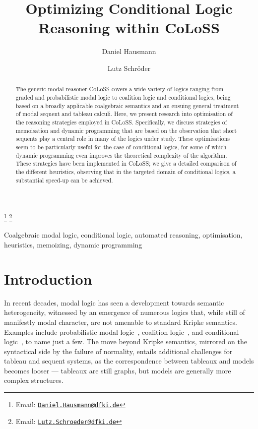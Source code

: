 \documentclass{entcs} \usepackage{entcsmacro}
\newcommand{\COLOSS}{{\textrm CoLoSS}}
\begin{document}
\begin{frontmatter}
  \title{Optimizing Conditional Logic Reasoning within \COLOSS}
  \author[DFKI]{Daniel Hausmann}
  \author[DFKI,UBremen]{Lutz Schr\"oder}
  \address[DFKI]{DFKI Bremen, SKS}
  \address[UBremen]{Department of Mathematics and Computer Science, Universit\"at Bremen, Germany}
  \thanks[myemail]{Email: \href{mailto:Daniel.Hausmann@dfki.de} {\texttt{\normalshape Daniel.Hausmann@dfki.de}}}
  \thanks[coemail]{Email: \href{mailto:Lutz.Schroeder@dfki.de} {\texttt{\normalshape Lutz.Schroeder@dfki.de}}}
\begin{abstract} 
  The generic modal reasoner CoLoSS covers a wide variety of logics
  ranging from graded and probabilistic modal logic to coalition logic
  and conditional logics, being based on a broadly applicable
  coalgebraic semantics and an ensuing general treatment of modal
  sequent and tableau calculi. Here, we present research into
  optimisation of the reasoning strategies employed in
  CoLoSS. Specifically, we discuss strategies of memoisation and
  dynamic programming that are based on the observation that short
  sequents play a central role in many of the logics under
  study. These optimisations seem to be particularly useful for the
  case of conditional logics, for some of which dynamic programming
  even improves the theoretical complexity of the algorithm. These
  strategies have been implemented in CoLoSS; we give a detailed
  comparison of the different heuristics, observing that in the
  targeted domain of conditional logics, a substantial speed-up can be
  achieved.
\end{abstract}
\begin{keyword}
  Coalgebraic modal logic, conditional logic, automated reasoning,
  optimisation, heuristics, memoizing, dynamic programming
\end{keyword}
\end{frontmatter}
\section{Introduction}\label{intro}

In recent decades, modal logic has seen a development towards semantic
heterogeneity, witnessed by an emergence of numerous logics that,
while still of manifestly modal character, are not amenable to
standard Kripke semantics. Examples include probabilistic modal
logic~\cite{FaginHalpern94}, coalition logic~\cite{Pauly02}, and
conditional logic~\cite{Chellas80}, to name just a few. The move
beyond Kripke semantics, mirrored on the syntactical side by the
failure of normality, entails additional challenges for tableau and
sequent systems, as the correspondence between tableaux and models
becomes looser --- tableaux are still graphs, but models are generally
more complex structures.
\end{document}
